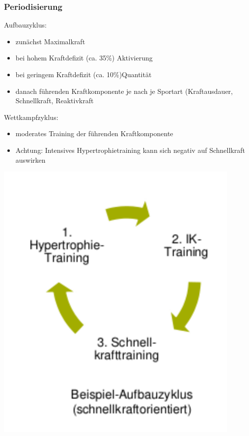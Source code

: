 \subsubsection*{Periodisierung}

\begin{minipage}{0.7\textwidth}
    Aufbauzyklus:
    \begin{itemize}
        \item zunächst Maximalkraft
        \item bei hohem Kraftdefizit (ca. 35\%) Aktivierung
        \item bei geringem Kraftdefizit (ca. 10\%)Quantität
        \item danach führenden Kraftkomponente je nach je Sportart (Kraftausdauer, Schnellkraft, Reaktivkraft
    \end{itemize}

    Wettkampfzyklus:
    \begin{itemize}
        \item moderates Training der führenden Kraftkomponente
        \item  Achtung: Intensives Hypertrophietraining kann sich negativ auf Schnellkraft auswirken
    \end{itemize}
\end{minipage}
\begin{minipage}{0.3\textwidth}
    \includegraphics[width=0.9\textwidth]{pictures/bsp_aufbauzyklus}
\end{minipage}

